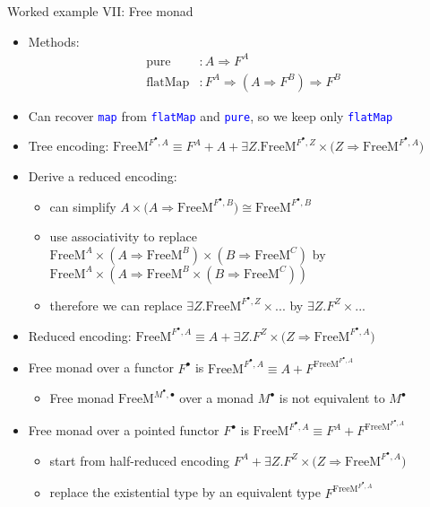 \documentclass[english,,russian]{beamer}
\begin{document}
\begin{frame}{Worked example VII: Free monad}
\begin{itemize}
\item {\footnotesize{}\vspace{-0.25cm}}Methods:{\footnotesize{}\vspace{-0.25cm}}
\begin{align*}
\text{pure} & :A\Rightarrow F^{A}\\
\text{flatMap} & :F^{A}\Rightarrow(A\Rightarrow F^{B})\Rightarrow F^{B}
\end{align*}
\item {\footnotesize{}\vspace{-0.2cm}}Can recover \texttt{\textcolor{blue}{\footnotesize{}map}}
from \texttt{\textcolor{blue}{\footnotesize{}flatMap}} and \texttt{\textcolor{blue}{\footnotesize{}pure}},
so we keep only \texttt{\textcolor{blue}{\footnotesize{}flatMap}} 
\item Tree encoding: {\footnotesize{}$\text{FreeM}^{F^{\bullet},A}\equiv F^{A}+A+\exists Z.\text{FreeM}^{F^{\bullet},Z}\times\big(Z\Rightarrow\text{FreeM}^{F^{\bullet},A}\big)$}{\footnotesize\par}
\item Derive a reduced encoding: 
\begin{itemize}
\item can simplify $A\times\big(A\Rightarrow\text{FreeM}^{F^{\bullet},B}\big)\cong\text{FreeM}^{F^{\bullet},B}$
\item use associativity to replace $\text{FreeM}^{A}\times(A\Rightarrow\text{FreeM}^{B})\times(B\Rightarrow\text{FreeM}^{C})$
by $\text{FreeM}^{A}\times\left(A\Rightarrow\text{FreeM}^{B}\times(B\Rightarrow\text{FreeM}^{C})\right)$
\item therefore we can replace $\exists Z.\text{FreeM}^{F^{\bullet},Z}\times...$
by $\exists Z.F^{Z}\times...$
\end{itemize}
\item Reduced encoding: $\text{FreeM}^{F^{\bullet},A}\equiv A+\exists Z.F^{Z}\times\big(Z\Rightarrow\text{FreeM}^{F^{\bullet},A}\big)$
\item Free monad over a functor $F^{\bullet}$ is $\text{FreeM}^{F^{\bullet},A}\equiv A+F^{\text{FreeM}^{F^{\bullet},A}}$
\begin{itemize}
\item Free monad $\text{FreeM}^{M^{\bullet},\bullet}$ over a monad $M^{\bullet}$
is not equivalent to $M^{\bullet}$
\end{itemize}
\item Free monad over a pointed functor $F^{\bullet}$ is {\footnotesize{}$\text{FreeM}^{F^{\bullet},A}\equiv F^{A}+F^{\text{FreeM}^{F^{\bullet},A}}$}{\footnotesize\par}
\begin{itemize}
\item start from half-reduced encoding $F^{A}+\exists Z.F^{Z}\times\big(Z\Rightarrow\text{FreeM}^{F^{\bullet},A}\big)$ 
\item replace the existential type by an equivalent type $F^{\text{FreeM}^{F^{\bullet},A}}$
\end{itemize}
\end{itemize}
\end{frame}
\end{document}
